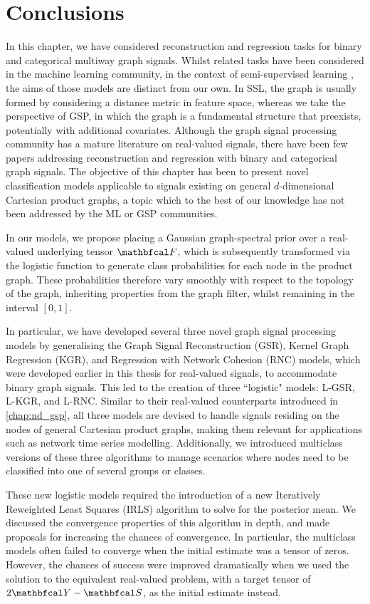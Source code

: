 \section{Conclusions}

In this chapter, we have considered reconstruction and regression tasks for binary and categorical multiway graph signals. Whilst related tasks have been considered in the machine learning community, in the context of semi-supervised learning \cite{Kondor2002,Zhu2003}, the aims of those models are distinct from our own. In SSL, the graph is usually formed by considering a distance metric in feature space, whereas we take the perspective of GSP, in which the graph is a fundamental structure that preexists, potentially with additional covariates. Although the graph signal processing community has a mature literature on real-valued signals, there have been few papers addressing reconstruction and regression with binary and categorical graph signals. The objective of this chapter has been to present novel classification models applicable to signals existing on general $d$-dimensional Cartesian product graphs, a topic which to the best of our knowledge has not been addressed by the ML or GSP communities. 

In our models, we propose placing a Gaussian graph-spectral prior over a real-valued underlying tensor $\Ft$, which is subsequently transformed via the logistic function to generate class probabilities for each node in the product graph. These probabilities therefore vary smoothly with respect to the topology of the graph, inheriting properties from the graph filter, whilst remaining in the interval $[0, 1]$. 

In particular, we have developed several three novel graph signal processing models by generalising the Graph Signal Reconstruction (GSR), Kernel Graph Regression (KGR), and Regression with Network Cohesion (RNC) models, which were developed earlier in this thesis for real-valued signals, to accommodate binary graph signals. This led to the creation of three ``logistic" models: L-GSR, L-KGR, and L-RNC. Similar to their real-valued counterparts introduced in \cref{chap:nd_gsp}, all three models are devised to handle signals residing on the nodes of general Cartesian product graphs, making them relevant for applications such as network time series modelling. Additionally, we introduced multiclass versions of these three algorithms to manage scenarios where nodes need to be classified into one of several groups or classes. 

These new logistic models required the introduction of a new Iteratively Reweighted Least Squares (IRLS) algorithm to solve for the posterior mean. We discussed the convergence properties of this algorithm in depth, and made proposals for increasing the chances of convergence. In particular, the multiclass models often failed to converge when the initial estimate was a tensor of zeros. However, the chances of success were improved dramatically when we used the solution to the equivalent real-valued problem, with a target tensor of $2\Yt - \St$, as the initial estimate instead. 

